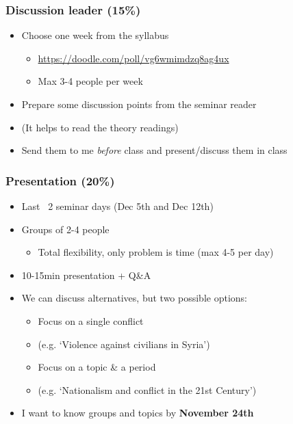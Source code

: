 \documentclass[aspectratio=43]{beamer}
\begin{document}
\begin{frame}
\frametitle{Discussion leader (15\%)}
\centering

\begin{itemize}
\item Choose one week from the syllabus
\begin{itemize}
  \item \href{https://doodle.com/poll/vg6wmimdzq8ag4ux}{https://doodle.com/poll/vg6wmimdzq8ag4ux}
  \item Max 3-4 people per week
\end{itemize}
\item Prepare some discussion points from the seminar reader
\item (It helps to read the theory readings)
\item Send them to me \textit{before} class and present/discuss them in class
\end{itemize}

\end{frame}

\begin{frame}
\frametitle{Presentation (20\%)}
\centering

\begin{itemize}
\item Last ~2 seminar days (Dec 5th and Dec 12th)
\item Groups of 2-4 people
\begin{itemize}
  \item Total flexibility, only problem is time (max 4-5 per day)
\end{itemize}
\item 10-15min presentation + Q\&A
\item We can discuss alternatives, but two possible options:
\begin{itemize}
  \item Focus on a single conflict
  \item[] (e.g. `Violence against civilians in Syria')
  \item Focus on a topic \& a period
  \item[] (e.g. `Nationalism and conflict in the 21st Century')
\end{itemize}
\item I want to know groups and topics by \textbf{November 24th}
\end{itemize}

\end{frame}
\end{document}
